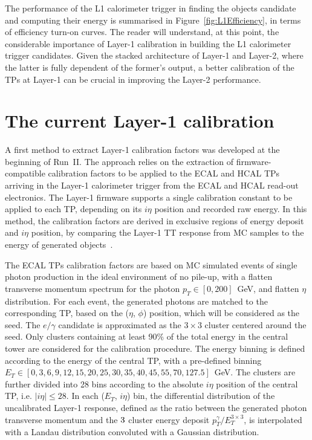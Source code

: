 \bigbreak

The performance of the L1 calorimeter trigger in finding the objects candidate and computing their energy is summarised in Figure~\ref{fig:L1Efficiency}, in terms of efficiency turn-on curves.
The reader will understand, at this point, the considerable importance of Layer-1 calibration in building the L1 calorimeter trigger candidates. 
Given the stacked architecture of Layer-1 and Layer-2, where the latter is fully dependent of the former's output, a better calibration of the TPs at Layer-1 can be crucial in improving the Layer-2 performance.

\section{The current Layer-1 calibration}
\label{sec:The current Layer-1 calibration}

A first method to extract Layer-1 calibration factors was developed at the beginning of Run~II. 
The approach relies on the extraction of firmware-compatible calibration factors to be applied to the ECAL and HCAL TPs arriving in the Layer-1 calorimeter trigger from the ECAL and HCAL read-out electronics.
The Layer-1 firmware supports a single calibration constant to be applied to each TP, depending on its $i\eta$ position and recorded raw energy.
In this method, the calibration factors are derived in exclusive regions of energy deposit and $i\eta$ position, by comparing the Layer-1 TT response from MC samples to the energy of generated objects~\cite{Sirunyan_2020}.

The ECAL TPs calibration factors are based on MC simulated events of single photon production in the ideal environment of no pile-up, with a flatten transverse momentum spectrum for the photon $p_T \in [0,200]$~GeV, and flatten $\eta$ distribution.
For each event, the generated photons are matched to the corresponding TP, based on the ($\eta$, $\phi$) position, which will be considered as the seed. The $e/\gamma$ candidate is approximated as the $3\times3$ cluster centered around the seed. 
Only clusters containing at least 90\% of the total energy in the central tower are considered for the calibration procedure.
The energy binning is defined according to the energy of the central TP, with a pre-defined binning $E_T\in[0,3,6,9,12,15,20,25,30,35,40,45,55,70,127.5]$~GeV.
The clusters are further divided into 28 bins according to the absolute $i\eta$ position of the central TP, i.e. $|i\eta|\leq28$.
In each ($E_T$, $i\eta$) bin, the differential distribution of the uncalibrated Layer-1 response, defined as the ratio between the generated photon transverse momentum and the $3\time3$ cluster energy deposit $p_T^{\gamma}/E_T^{3\times3}$, is interpolated with a Landau distribution convoluted with a Gaussian distribution.

